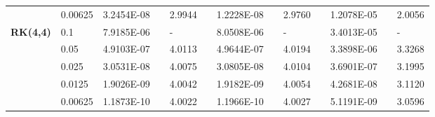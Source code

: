 \begin{table}[H]
\begin{tabular}{lllllrlrlrlrlrl}
	\multicolumn{2}{l}{} & \multicolumn{2}{l}{0.00625} & 3.2454E-08 &       & 2.9944  &       & 1.2228E-08 &       & 2.9760  &       & 1.2078E-05 &       & 2.0056  \\
	\multicolumn{2}{l}{\multirow{5}[1]{*}{\textbf{RK(4,4)}}} & \multicolumn{2}{l}{0.1} & 7.9185E-06 &       & -     &       & 8.0508E-06 &       & -     &       & 3.4013E-05 &       & - \\
	\multicolumn{2}{l}{} & \multicolumn{2}{l}{0.05} & 4.9103E-07 &       & 4.0113  &       & 4.9644E-07 &       & 4.0194  &       & 3.3898E-06 &       & 3.3268  \\
	\multicolumn{2}{l}{} & \multicolumn{2}{l}{0.025} & 3.0531E-08 &       & 4.0075  &       & 3.0805E-08 &       & 4.0104  &       & 3.6901E-07 &       & 3.1995  \\
	\multicolumn{2}{l}{} & \multicolumn{2}{l}{0.0125} & 1.9026E-09 &       & 4.0042  &       & 1.9182E-09 &       & 4.0054  &       & 4.2681E-08 &       & 3.1120  \\
	\multicolumn{2}{l}{} & \multicolumn{2}{l}{0.00625} & 1.1873E-10 &       & 4.0022  &       & 1.1966E-10 &       & 4.0027  &       & 5.1191E-09 &       & 3.0596  \\
	\bottomrule
	\end{tabular}%
	\label{tab:6-2}%
	\end{table}%
		

